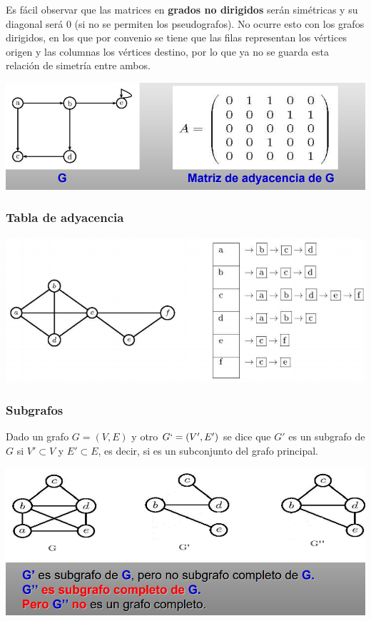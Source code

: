 \documentclass[10pt,a4paper,openright]{book}
\begin{document}
Es fácil observar que las matrices en \textbf{grados no dirigidos} serán simétricas y su diagonal será 0 (si no se permiten los pseudografos). No ocurre esto con los grafos dirigidos, en los que por convenio se tiene que las filas representan los vértices origen y las columnas los vértices destino, por lo que ya no se guarda esta relación de simetría entre ambos.

\begin{center}
\includegraphics[scale=0.65]{matriz grafo dirigido}
\end{center}

\subsubsection*{Tabla de adyacencia}

\begin{center}
\includegraphics[scale=0.65]{tabla de adyacencia}
\end{center}

\subsubsection*{Subgrafos}
Dado un grafo $G=(V,E)$ y otro $G`=(V',E')$ se dice que $G'$ es un subgrafo de $G$ si $V'\subset V$ y $E'\subset E$, es decir, si es un subconjunto del grafo principal.

\begin{center}
\includegraphics[scale=0.65]{subgrafos}
\end{center}
\end{document}
